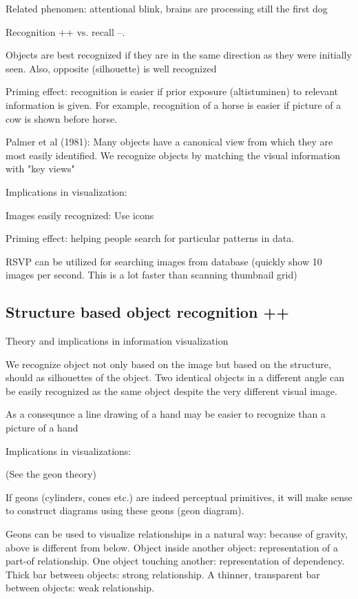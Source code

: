 \documentclass[a4paper]{article}
\begin{document}
Related phenomen: attentional blink, brains are processing still the first dog

Recognition ++ vs. recall --.

Objects are best recognized if they are in the same direction as they were initially seen. Also, opposite (silhouette) is well recognized

Priming effect: recognition is easier if prior exposure (altistuminen) to relevant information is given. For example, recognition of a horse is easier if picture of a cow is shown before horse.

Palmer et al (1981): Many objects have a canonical view from which they are most easily identified. We recognize objects by matching the visual information with "key views"

Implications in visualization:

Images easily recognized: Use icons

Priming effect: helping people search for particular patterns in data.

RSVP can be utilized for searching images from database (quickly show 10 images per second. This is a lot faster than scanning thumbnail grid)



\subsection{Structure based object recognition ++}

Theory and implications in information visualization

We recognize object not only based on the image but based on the structure, should as silhouettes of the object. Two identical objects in a different angle can be easily recognized as the same object despite the very different visual image.

As a consequnce a line drawing of a hand may be easier to recognize than a picture of a hand

Implications in visualizations:

(See the geon theory)

If geons (cylinders, cones etc.) are indeed perceptual primitives, it will make sense to construct diagrams using these geons (geon diagram). 

Geons can be used to visualize relationships in a natural way: because of gravity, above is different from below. Object inside another object: representation of a part-of relationship. One object touching another: representation of dependency. Thick bar between objects: strong relationship. A thinner, transparent bar between objects: weak relationship.
\end{document}
